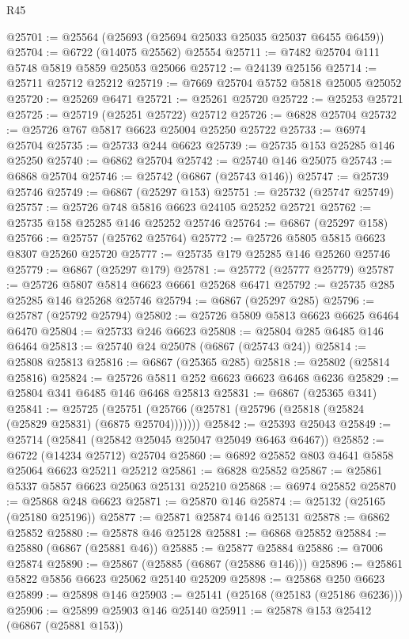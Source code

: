 \begin{lexlean}{R45}
\begin{coremodule}
{@25701 := @25564 (@25693 (@25694 @25033 @25035 @25037 @6455 @6459))
@25704 := @6722 (@14075 @25562) @25554
@25711 := @7482 @25704 @111 @5748 @5819 @5859 @25053 @25066
@25712 := @24139 @25156
@25714 := @25711 @25712 @25212
@25719 := @7669 @25704 @5752 @5818 @25005 @25052
@25720 := @25269 @6471
@25721 := @25261 @25720
@25722 := @25253 @25721
@25725 := @25719 (@25251 @25722) @25712
@25726 := @6828 @25704
@25732 := @25726 @767 @5817 @6623 @25004 @25250 @25722
@25733 := @6974 @25704
@25735 := @25733 @244 @6623
@25739 := @25735 @153 @25285 @146 @25250
@25740 := @6862 @25704
@25742 := @25740 @146 @25075
@25743 := @6868 @25704
@25746 := @25742 (@6867 (@25743 @146))
@25747 := @25739 @25746
@25749 := @6867 (@25297 @153)
@25751 := @25732 (@25747 @25749)
@25757 := @25726 @748 @5816 @6623 @24105 @25252 @25721
@25762 := @25735 @158 @25285 @146 @25252 @25746
@25764 := @6867 (@25297 @158)
@25766 := @25757 (@25762 @25764)
@25772 := @25726 @5805 @5815 @6623 @8307 @25260 @25720
@25777 := @25735 @179 @25285 @146 @25260 @25746
@25779 := @6867 (@25297 @179)
@25781 := @25772 (@25777 @25779)
@25787 := @25726 @5807 @5814 @6623 @6661 @25268 @6471
@25792 := @25735 @285 @25285 @146 @25268 @25746
@25794 := @6867 (@25297 @285)
@25796 := @25787 (@25792 @25794)
@25802 := @25726 @5809 @5813 @6623 @6625 @6464 @6470
@25804 := @25733 @246 @6623
@25808 := @25804 @285 @6485 @146 @6464
@25813 := @25740 @24 @25078 (@6867 (@25743 @24))
@25814 := @25808 @25813
@25816 := @6867 (@25365 @285)
@25818 := @25802 (@25814 @25816)
@25824 := @25726 @5811 @252 @6623 @6623 @6468 @6236
@25829 := @25804 @341 @6485 @146 @6468 @25813
@25831 := @6867 (@25365 @341)
@25841 := @25725
    (@25751 (@25766 (@25781 (@25796 (@25818 (@25824 (@25829 @25831) (@6875 @25704)))))))
@25842 := @25393 @25043
@25849 := @25714 (@25841 (@25842 @25045 @25047 @25049 @6463 @6467))
@25852 := @6722 (@14234 @25712) @25704
@25860 := @6892 @25852 @803 @4641 @5858 @25064 @6623 @25211 @25212
@25861 := @6828 @25852
@25867 := @25861 @5337 @5857 @6623 @25063 @25131 @25210
@25868 := @6974 @25852
@25870 := @25868 @248 @6623
@25871 := @25870 @146
@25874 := @25132 (@25165 (@25180 @25196))
@25877 := @25871 @25874 @146 @25131
@25878 := @6862 @25852
@25880 := @25878 @46 @25128
@25881 := @6868 @25852
@25884 := @25880 (@6867 (@25881 @46))
@25885 := @25877 @25884
@25886 := @7006 @25874
@25890 := @25867 (@25885 (@6867 (@25886 @146)))
@25896 := @25861 @5822 @5856 @6623 @25062 @25140 @25209
@25898 := @25868 @250 @6623
@25899 := @25898 @146
@25903 := @25141 (@25168 (@25183 (@25186 @6236)))
@25906 := @25899 @25903 @146 @25140
@25911 := @25878 @153 @25412 (@6867 (@25881 @153))
}
\end{coremodule}
\end{lexlean}

